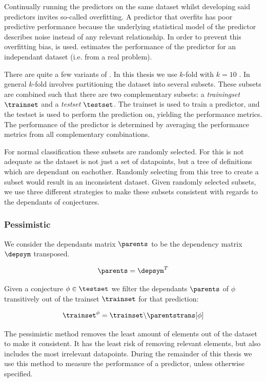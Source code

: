 Continually running the predictors on the same dataset whilst developing said predictors invites so-called overfitting.
A predictor that overfits has poor predictive performance because the underlying statistical model of the predictor describes noise instead of any relevant relationship.
In order to prevent this overfitting bias, \crossvalidation is used.
\crossvalidation estimates the performance of the predictor for an independant dataset (i.e. from a real problem).

There are quite a few variants of \crossvalidation.
In this thesis we use $k$-fold \crossvalidation with $k = 10$ \cite{kohavi1995study}.
In general $k$-fold \crossvalidation involves partitioning the dataset into several subsets.
These subsets are combined such that there are two complementary subsets: a \emph{trainingset} $\trainset$ and a \emph{testset} $\testset$.
The trainset is used to train a predictor, and the testset is used to perform the prediction on, yielding the performance metrics.
The performance of the predictor is determined by averaging the performance metrics from all complementary combinations.


For normal classification these subsets are randomly selected.
For \premiseselection this is not adequate as the dataset is not just a set of datapoints, but a tree of definitions which are dependant on eachother.
Randomly selecting from this tree to create a subset would result in an inconsistent dataset.
Given randomly selected subsets, we use three different strategies to make these subsets consistent with regards to the dependants of conjectures.

\subsubsection{Pessimistic}
We consider the dependants matrix $\parents$ to be the dependency matrix $\depsym$ transposed.
\begin{definition}
  \[
    \parents = \depsym^{T}
  \]
\end{definition}

Given a conjecture $\phi \in \testset$ we filter the dependants $\parents$ of $\phi$ transitively out of the trainset $\trainset$ for that prediction:
\begin{definition}
  \[
    \trainset^{\phi} = \trainset \backslash \parentstrans[\phi]
  \]
\end{definition}
The pessimistic method removes the least amount of elements out of the dataset to make it consistent.
It has the least risk of removing relevant elements, but also includes the most irrelevant datapoints.
During the remainder of this thesis we use this method to measure the performance of a predictor, unless otherwise specified.

